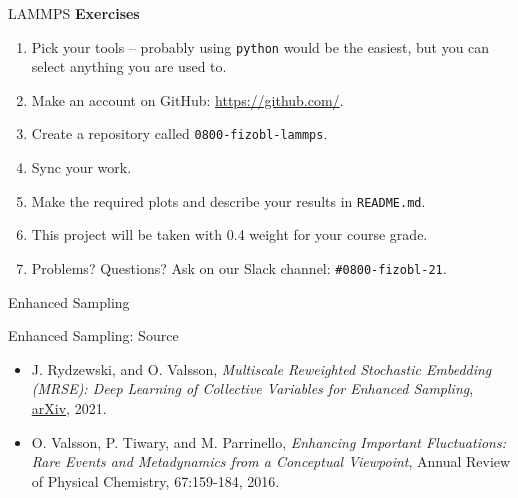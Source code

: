 \documentclass[10pt]{beamer}
\begin{document}
\begin{frame}{LAMMPS}
  \textbf{Exercises}\\[0.2cm]
  \begin{enumerate}
    \setlength\itemsep{1em}
    \item Pick your tools -- probably using \texttt{python} would be the easiest, but you can select anything you are used to.

    \item Make an account on GitHub: \url{https://github.com/}.

    \item Create a repository called \texttt{0800-fizobl-lammps}.

    \item Sync your work.

    \item Make the required plots and describe your results in \texttt{README.md}.

    \item This project will be taken with 0.4 weight for your course grade.

    \item Problems? Questions? Ask on our Slack channel: \texttt{\#0800-fizobl-21}.
  \end{enumerate}
\end{frame}

\begin{frame}{}
  \begin{center}
    \fontsize{25pt}{6}\selectfont\vspace{1.2cm}
    \textcolor{subtitle}{Enhanced Sampling}
  \end{center}
\end{frame}

\begin{frame}{Enhanced Sampling: Source}
  \begin{itemize}
  \setlength\itemsep{1em}
    \item J. Rydzewski, and O. Valsson, \textit{Multiscale Reweighted Stochastic Embedding (MRSE): Deep Learning of Collective Variables for Enhanced Sampling}, \href{https://arxiv.org/abs/2007.06377}{arXiv}, 2021.
    \item O. Valsson, P. Tiwary, and M. Parrinello, \textit{Enhancing Important Fluctuations: Rare Events and Metadynamics from a Conceptual Viewpoint}, Annual Review of Physical Chemistry, 67:159-184, 2016.
  \end{itemize}
\end{frame}
\end{document}

